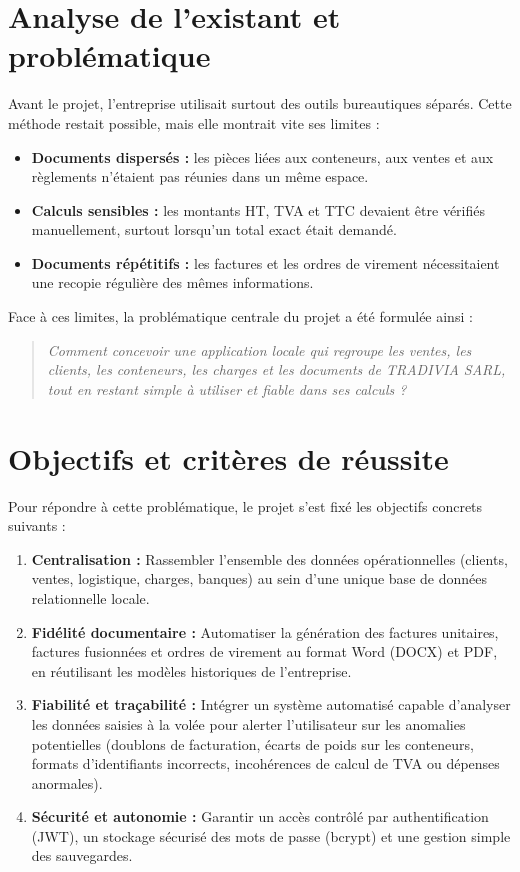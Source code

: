 \documentclass[12pt,a4paper,oneside]{report}
\newcommand{\Entreprise}{TRADIVIA SARL}
\begin{document}
\section{Analyse de l'existant et problématique}
Avant le projet, l'entreprise utilisait surtout des outils bureautiques séparés. Cette méthode restait possible, mais elle montrait vite ses limites :

\begin{itemize}
  \item \textbf{Documents dispersés :} les pièces liées aux conteneurs, aux ventes et aux règlements n'étaient pas réunies dans un même espace.
  \item \textbf{Calculs sensibles :} les montants HT, TVA et TTC devaient être vérifiés manuellement, surtout lorsqu'un total exact était demandé.
  \item \textbf{Documents répétitifs :} les factures et les ordres de virement nécessitaient une recopie régulière des mêmes informations.
\end{itemize}

Face à ces limites, la problématique centrale du projet a été formulée ainsi :
\begin{quote}
\textit{Comment concevoir une application locale qui regroupe les ventes, les clients, les conteneurs, les charges et les documents de \Entreprise, tout en restant simple à utiliser et fiable dans ses calculs ?}
\end{quote}

\section{Objectifs et critères de réussite}
Pour répondre à cette problématique, le projet s'est fixé les objectifs concrets suivants :
\begin{enumerate}
  \item \textbf{Centralisation :} Rassembler l'ensemble des données opérationnelles (clients, ventes, logistique, charges, banques) au sein d'une unique base de données relationnelle locale.
  \item \textbf{Fidélité documentaire :} Automatiser la génération des factures unitaires, factures fusionnées et ordres de virement au format Word (DOCX) et PDF, en réutilisant les modèles historiques de l'entreprise.
  \item \textbf{Fiabilité et traçabilité :} Intégrer un système automatisé capable d'analyser les données saisies à la volée pour alerter l'utilisateur sur les anomalies potentielles (doublons de facturation, écarts de poids sur les conteneurs, formats d'identifiants incorrects, incohérences de calcul de TVA ou dépenses anormales).
  \item \textbf{Sécurité et autonomie :} Garantir un accès contrôlé par authentification (JWT), un stockage sécurisé des mots de passe (bcrypt) et une gestion simple des sauvegardes.
\end{enumerate}
\end{document}

